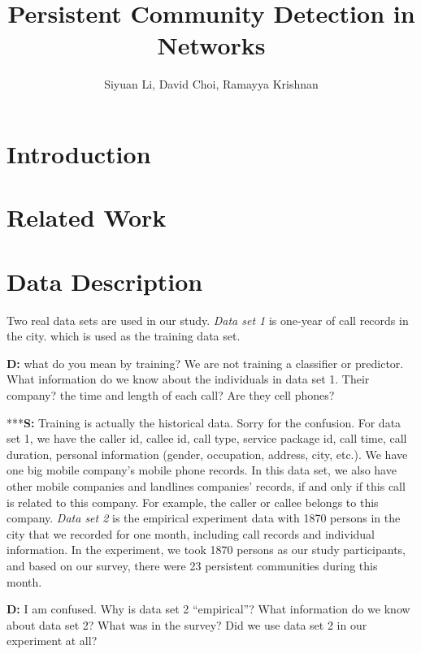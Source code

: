 \documentclass{article}
\begin{document}
\title{Persistent Community Detection in Networks}
\author{Siyuan Li, David Choi, Ramayya Krishnan}

\maketitle


\begin{abstract}

\end{abstract}

\section{Introduction}

\section{Related Work}

\section{Data Description}

Two real data sets are used in our study. \textit{Data set 1} is one-year of call records in the city. which is used as the
training data set. 

\textbf{D:} what do you mean by training? We are not training a classifier or predictor. What information do we know about the individuals in data set 1. Their company? the time and length of each call? Are they cell phones? 

***\textbf{S:} Training is actually the historical data. Sorry for the confusion. For data set 1, we have the caller id, callee id, call type, service package id, call time, call duration, personal information (gender, occupation, address, city, etc.). We have one big mobile company's mobile phone records. In this data set, we also have other mobile companies and landlines companies' records, if and only if this call is related to this company. For example, the caller or callee belongs to this company.
\textit{Data set 2} is the empirical experiment data with 1870 persons
in the city that we recorded for one month, including call records and individual information. In the experiment, we
took 1870 persons as our study participants, and based on our survey, there were 23 persistent communities during this month.

\textbf{D:} I am confused. Why is data set 2 ``empirical''? What information do we know about data set 2? What was in the survey? Did we use data set 2 in our experiment at all?
\end{document}
